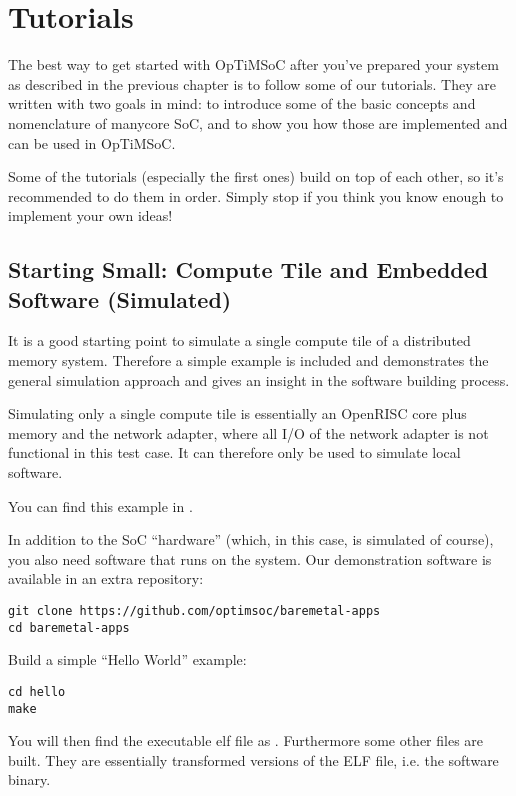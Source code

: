 \chapter{Tutorials}
\label{chap:tutorials}

The best way to get started with OpTiMSoC after you've prepared your
system as described in the previous chapter is to follow some of our
tutorials. They are written with two goals in mind: to introduce some
of the basic concepts and nomenclature of manycore SoC, and to show
you how those are implemented and can be used in OpTiMSoC.

Some of the tutorials (especially the first ones) build on top of each
other, so it's recommended to do them in order. Simply stop if you
think you know enough to implement your own ideas!


\section{Starting Small: Compute Tile and Embedded Software (Simulated)}

It is a good starting point to simulate a single compute tile of a
distributed memory system. Therefore a simple example is included and
demonstrates the general simulation approach and gives an insight in
the software building process.

Simulating only a single compute tile is essentially an OpenRISC core
plus memory and the network adapter, where all I/O of the network
adapter is not functional in this test case. It can therefore only be
used to simulate local software.

You can find this example in .

In addition to the SoC ``hardware'' (which, in this case, is simulated of course), you also need software that runs on the system.
Our demonstration software is available in an extra repository:

\begin{lstlisting}
git clone https://github.com/optimsoc/baremetal-apps
cd baremetal-apps
\end{lstlisting}

Build a simple ``Hello World'' example:

\begin{lstlisting}
cd hello
make
\end{lstlisting}

You will then find the executable elf file as .
Furthermore some other files are built.
They are essentially transformed versions of the ELF file, i.e. the software binary.

